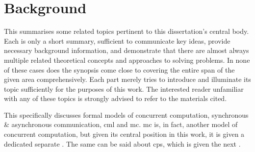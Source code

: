 \chapter{\label{chap:back}Background}
This  summarises some related topics pertinent to this dissertation's central body.  Each is only a short summary, sufficient to communicate key ideas, provide necessary background information, and demonstrate that there are almost always multiple related theoretical concepts and approaches to solving problems.  In none of these cases does the synopsis come close to covering the entire span of the given area comprehensively.  Each part merely tries to introduce and illuminate its topic sufficiently for the purposes of this work.  The interested reader unfamiliar with any of these topics is strongly advised to refer to the materials cited.


This  specifically discusses formal models of concurrent computation, synchronous \& asynchronous communication, \gls{cml} and \gls{mc}.  \Gls{mc} is, in fact, another model of concurrent computation, but given its central position in this work, it is given a dedicated separate .  The same can be said about \gls{cps}, which is given the next .




